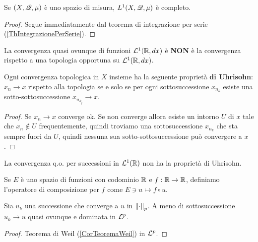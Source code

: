 \begin{proposition}[$L^1$ \`e completo]\label{PrL1Completo}
Se $(X,\mathscr{Q},\mu)$ \`e uno spazio di misura, $L^1(X,\mathscr{Q},\mu)$ \`e completo.
\end{proposition}
\begin{proof}
Segue immediatamente dal teorema di integrazione per serie (\ref{ThIntegrazionePerSerie}).
\end{proof}

\begin{remark}
La convergenza quasi ovunque di funzioni $\mathcal{L}^1(\mathbb{R},dx)$ \`e \textbf{NON} \`e la convergenza rispetto a una topologia opportuna su $\mathcal{L}^1(\mathbb{R},dx)$.

\begin{proposition}\label{PrProprietaUhrisohn}
Ogni convergenza topologica in $X$ insieme ha la seguente propriet\`a \textbf{di Uhrisohn}: $x_n\to x$ rispetto alla topologia se e solo se per ogni sottosuccessione $x_{n_k}$ esiste una sotto-sottosuccessione $x_{n_{k_j}}\to x$.
\end{proposition}
\begin{proof}
Se $x_n\to x$ converge ok. Se non converge allora esiste un intorno $U$ di $x$ tale che $x_n\notin U$ frequentemente, quindi troviamo una sottosuccessione $x_{n_k}$ che sta sempre fuori da $U$, quindi nessuna sua sotto-sottosuccessione pu\`o convergere a $x$.
\end{proof} 

La convergenza q.o. per successioni in $\mathcal{L}^1(\mathbb{R})$ non ha la propriet\`a di Uhrisohn.
\end{remark}

\begin{definition}
Se $E$ \`e uno spazio di funzioni con codominio $\mathbb{R}$ e $f:\mathbb{R}\to\mathbb{R}$, definiamo l'operatore di composizione per $f$ come $E\ni u\mapsto f\circ u$.
\end{definition}

\begin{lemma}
Sia $u_k$ una successione che converge a $u$ in $\left\Vert{\cdot}\right\Vert_p$. A meno di sottosuccessione $u_k\to u$ quasi ovunque e dominata in $\mathcal{L}^p$.
\end{lemma}
\begin{proof}
Teorema di Weil (\ref{CorTeoremaWeil}) in $\mathcal{L}^p$.
\end{proof}

